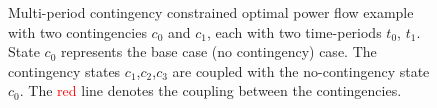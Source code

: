 \begin{figure}[h!]
\caption{Multi-period contingency constrained optimal power flow example with two contingencies $c_0$ and $c_1$, each with two time-periods $t_0$, $t_1$. State $c_0$ represents the base case (no contingency) case. The contingency states $c_1$,$c_2$,$c_3$ are coupled with the no-contingency state $c_0$. The {\textcolor{red}{red}} line denotes the coupling between the contingencies.}
\label{fig:ctopflow}
\end{figure}
